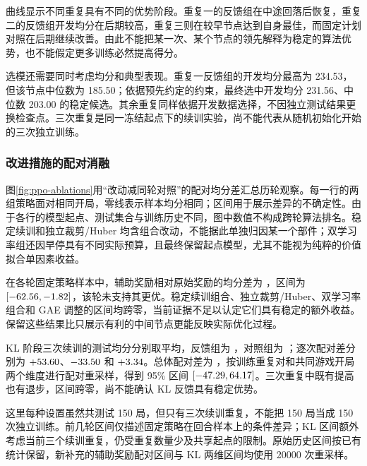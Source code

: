 曲线显示不同重复具有不同的优势阶段。重复一的反馈组在中途回落后恢复，重复二的反馈组开发均分在后期较高，重复三则在较早节点达到自身最佳，而固定计划对照在后期继续改善。由此不能把某一次、某个节点的领先解释为稳定的算法优势，也不能假定更多训练必然提高得分。

选模还需要同时考虑均分和典型表现。重复一反馈组的开发均分最高为 234.53，但该节点中位数为 185.50；依据预先约定的约束，最终选中开发均分 231.56、中位数 203.00 的稳定候选。其余重复同样依据开发数据选择，不因独立测试结果更换检查点。三次重复是同一冻结起点下的续训实验，尚不能代表从随机初始化开始的三次独立训练。

\subsubsection{改进措施的配对消融}
图\ref{fig:ppo-ablations}用“改动减同轮对照”的配对均分差汇总历轮观察。每一行的两组策略面对相同开局，零线表示样本均分相同；区间用于展示差异的不确定性。由于各行的模型起点、测试集合与训练历史不同，图中数值不构成跨轮算法排名。稳定续训和独立裁剪/Huber 均含组合改动，不能据此单独归因某一个部件；双学习率组还因早停具有不同实际预算，且最终保留起点模型，尤其不能视为纯粹的价值拟合单因素收益。


在各轮固定策略样本中，辅助奖励相对原始奖励的均分差为 \ShapingAblationDiff，区间为 $[-62.56,-1.82]$，该轮未支持其更优。稳定续训组合、独立裁剪/Huber、双学习率组合和 GAE 调整的区间均跨零，当前证据不足以认定它们具有稳定的额外收益。保留这些结果比只展示有利的中间节点更能反映实际优化过程。

KL 阶段三次续训的测试均分分别取平均，反馈组为 \KLAdaptiveMean，对照组为 \KLControlMean；逐次配对差分别为 $+53.60$、$-33.50$ 和 $+3.34$。总体配对差为 \KLAblationDiff，按训练重复对和共同游戏开局两个维度进行配对重采样，得到 95\% 区间 $[-47.29,64.17]$。三次重复中既有提高也有退步，区间跨零，尚不能确认 KL 反馈具有稳定优势。

这里每种设置虽然共测试 150 局，但只有三次续训重复，不能把 150 局当成 150 次独立训练。前几轮区间仅描述固定策略在回合样本上的条件差异；KL 区间额外考虑当前三个续训重复，仍受重复数量少及共享起点的限制。原始历史区间按已有统计保留，新补充的辅助奖励配对区间与 KL 两维区间均使用 20000 次重采样。

